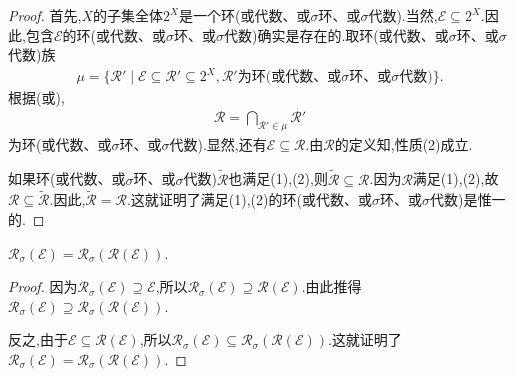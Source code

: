 \documentclass[../../main.tex]{subfiles}%
\begin{document}
\begin{proof}
首先,$X$的子集全体$2^X$是一个环(或代数、或$\sigma$环、或$\sigma$代数).当然,$\mathscr{E} \subseteq 2^X$.因此,包含$\mathscr{E}$的环(或代数、或$\sigma$环、或$\sigma$代数)确实是存在的.取环(或代数、或$\sigma$环、或$\sigma$代数)族
\begin{align*}
\mu = \{\mathscr{R}' \mid \mathscr{E} \subseteq \mathscr{R}' \subseteq 2^X, \mathscr{R}' \text{为环(或代数、或$\sigma$环、或$\sigma$代数)}\}.
\end{align*}
根据(或),
\begin{align*}
\mathscr{R} = \bigcap_{\mathscr{R}' \in \mu} \mathscr{R}'
\end{align*}
为环(或代数、或$\sigma$环、或$\sigma$代数).显然,还有$\mathscr{E} \subseteq \mathscr{R}$.由$\mathscr{R}$的定义知,性质(2)成立.

如果环(或代数、或$\sigma$环、或$\sigma$代数)$\widetilde{\mathscr{R}}$也满足(1),(2),则$\widetilde{\mathscr{R}} \subseteq \mathscr{R}$.因为$\mathscr{R}$满足(1),(2),故$\mathscr{R} \subseteq \widetilde{\mathscr{R}}$.因此,$\widetilde{\mathscr{R}} = \mathscr{R}$.这就证明了满足(1),(2)的环(或代数、或$\sigma$环、或$\sigma$代数)是惟一的.
\end{proof}

\begin{theorem}
$\mathscr{R}_\sigma(\mathscr{E}) = \mathscr{R}_\sigma(\mathscr{R}(\mathscr{E})).$
\end{theorem}
\begin{proof}
因为$\mathscr{R}_\sigma(\mathscr{E}) \supseteq \mathscr{E}$,所以$\mathscr{R}_\sigma(\mathscr{E}) \supseteq \mathscr{R}(\mathscr{E})$.由此推得$\mathscr{R}_\sigma(\mathscr{E}) \supseteq \mathscr{R}_\sigma(\mathscr{R}(\mathscr{E})).$

反之,由于$\mathscr{E} \subseteq \mathscr{R}(\mathscr{E})$,所以$\mathscr{R}_\sigma(\mathscr{E}) \subseteq \mathscr{R}_\sigma(\mathscr{R}(\mathscr{E})).$这就证明了$\mathscr{R}_\sigma(\mathscr{E}) = \mathscr{R}_\sigma(\mathscr{R}(\mathscr{E})).$
\end{proof}
\end{document}
